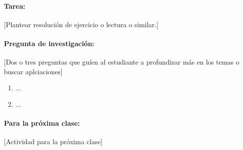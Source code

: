 \documentclass[a4,11pt]{aleph-notas}
\begin{document}
\paragraph{Tarea:} [Plantear resolución de ejercicio o lectura o similar.]

\paragraph{Pregunta de investigación:} [Dos o tres preguntas que guíen al estudiante a profundizar más en los temas o buscar aplciaciones]
\begin{enumerate}[leftmargin=*]
    \item ...
    \item ...
\end{enumerate}
    
\paragraph{Para la próxima clase:}  [Actividad para la próxima clase]
\end{document}
